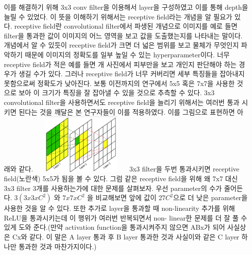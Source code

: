 \documentclass[extendedabs]{bmvc2k}
\begin{document}
 이를 해결하기 위해 3x3 conv filter을 이용해서 layer을 구성하였고 이를 통해 depth을 늘릴 수 있었다.
 이 뜻을 이해하기 위해서는 receptive field라는 개념을 알 필요가 있다. receptive field란 convolutional filter에서 
 파생된 개념으로 이미지를 예로 들면 filter을 통과한 값이 이미지의 어느 영역을 보고 값을 도출했는지를 나타내는 말이다. 
 개념에서 알 수 있듯이 receptive field가 크면 더 넓은 범위를 보고 물체가 무엇인지 파악하기 때문에 이미지의 정확도를 
 일부 높일 수 있는 hyperparameter이다. 너무 receptive field가 적은 예를 들면 개 사진에서 피부만을 보고 개인지 
 판단해야 하는 경우가 생길 수가 있다. 그러나 receptive field가 너무 커버리면 세부 특징들을 잡아내지 못함으로써 정확도가 낮아진다.
 보통 이전까지의 연구에서 5x5 혹은 7x7을 사용한 것으로 보아 이 크기가 특징을 잘 잡아낼 수 있을 것으로 추측할 수 있다.
 3x3 convolutional filter을 사용하면서도 receptive field을 늘리기 위해서는 여러번 통과 시키면 된다는 것을 깨달은 본 연구자들이 이를 적용하였다.
 이를 그림으로 표현하면 아래와 같다.
 \newline  \includegraphics[width=5cm, height=3cm]{images/03_VGG.png}
 \newline 3x3 filter을 두번 통과시키면 receptive field(노란색) 5x5가 됨을 볼 수 있다. 그럼 같은 receptive field을 위해 왜 7x7 대신 3x3 filter 3개를 사용하는가에 대한
 문제를 살펴보자. 우선 parameter의 수가 줄어든다. $3(3x3xC^2)$ 와 $7x7xC^2$ 을 비교해보면 앞에 값이 27$C^2$으로 더 낮은 parameter을 사용한 것을 알 수 있다. 또한 
 추가로 layer을 통과할 때 non-linearity 추가를 위해 ReLU을 통과시키는데 이 행위가 여러번 반복되면서 non- linear한 문제를 더 잘 풀 수 있게 도와 준다.(만약
 activation function을 통과시켜주지 않으면 ABx가 되어 사실상은 Cx와 같다. 이 말은 A layer 통과 후 B layer 통과한 것과 사실이와 같은 C layer 하나만 통과한 것과 마찬가지이다.)
\end{document}
